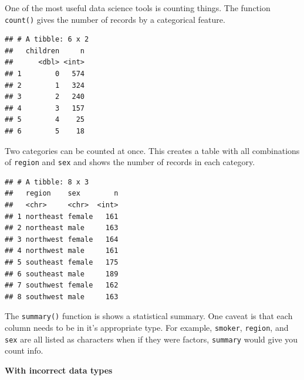 \documentclass[
  openany]{book}
\newenvironment{Shaded}{\begin{snugshade}}{\end{snugshade}}
\newcommand{\KeywordTok}[1]{\textcolor[rgb]{0.13,0.29,0.53}{\textbf{#1}}}
\newcommand{\NormalTok}[1]{#1}
\newcommand{\OperatorTok}[1]{\textcolor[rgb]{0.81,0.36,0.00}{\textbf{#1}}}
\newcommand{\StringTok}[1]{\textcolor[rgb]{0.31,0.60,0.02}{#1}}
\begin{document}
One of the most useful data science tools is counting things. The function \texttt{count()} gives the number of records by a categorical feature.

\begin{Shaded}
\end{Shaded}

\begin{verbatim}
## # A tibble: 6 x 2
##   children     n
##      <dbl> <int>
## 1        0   574
## 2        1   324
## 3        2   240
## 4        3   157
## 5        4    25
## 6        5    18
\end{verbatim}

Two categories can be counted at once. This creates a table with all combinations of \texttt{region} and \texttt{sex} and shows the number of records in each category.

\begin{Shaded}
\end{Shaded}

\begin{verbatim}
## # A tibble: 8 x 3
##   region    sex        n
##   <chr>     <chr>  <int>
## 1 northeast female   161
## 2 northeast male     163
## 3 northwest female   164
## 4 northwest male     161
## 5 southeast female   175
## 6 southeast male     189
## 7 southwest female   162
## 8 southwest male     163
\end{verbatim}

The \texttt{summary()} function is shows a statistical summary. One caveat is that each column needs to be in it's appropriate type. For example, \texttt{smoker}, \texttt{region}, and \texttt{sex} are all listed as characters when if they were factors, \texttt{summary} would give you count info.

\textbf{With incorrect data types}

\begin{Shaded}
\end{Shaded}
\end{document}
